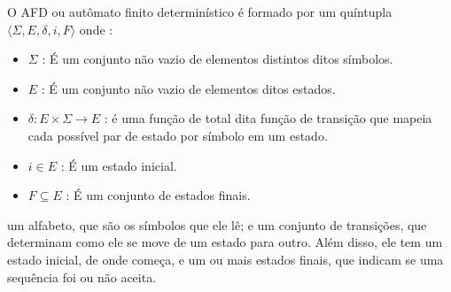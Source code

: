 
O AFD ou autômato finito determinístico é formado por um quíntupla $\langle \Sigma, E, \delta, i, F \rangle$ onde : 
\begin{itemize}
    \item $\Sigma$ : É um conjunto não vazio de elementos distintos ditos símbolos. 
    \item $E$ : É um conjunto não vazio de elementos ditos estados.
    \item $\delta : E \times \Sigma \to E$ : é uma função de total dita função de transição que mapeia cada possível par de estado por
                  símbolo  em um estado. 
    \item $i \in E$ : É um estado inicial.
    \item $F \subseteq E$ : É um conjunto de estados finais.
\end{itemize}








um alfabeto, que são os símbolos que ele lê; e um conjunto de transições, que determinam
como ele se move de um estado para outro. Além disso, ele tem um estado inicial, de onde
começa, e um ou mais estados finais, que indicam se uma sequência foi ou não aceita. 